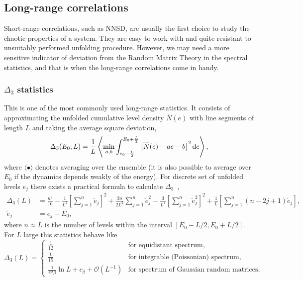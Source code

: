 \documentclass[a4paper,11pt,twoside]{article}
\begin{document}
    \subsection{Long-range correlations}
        Short-range correlations, such as NNSD, are usually the first choice to study the chaotic properties of a system.
        They are easy to work with and quite resistant to unsuitably performed unfolding procedure.
        However, we may need a more sensitive indicator of deviation from the Random Matrix Theory in the spectral statistics, and that is when the long-range correlations come in handy.

        \subsubsection{$\Delta_{3}$ statistics}
            This is one of the most commonly used long-range statistics.
            It consists of approximating the unfolded cumulative level density $\overline{N}(e)$ with line segments of length $L$ and taking the average square deviation,
            \begin{equation}
                \Delta_{3}(E_{0};L)
                =\frac{1}{L}\left\langle\min_{a,b}\int_{e_{0}-\frac{L}{2}}^{E_{0}+\frac{L}{2}}\left[\overline{N}(e)-ae-b\right]^{2}\mathrm{d} e\right\rangle,
            \end{equation}
            where $\langle\bullet\rangle$ denotes averaging over the ensemble (it is also possible to average over $E_{0}$ if the dynamics depends weakly of the energy).
            For discrete set of unfolded levels $e_{j}$ there exists a practical formula to calculate $\Delta_{3}$~\cite{Boh75},
            \begin{align}
                \Delta_{3}(L)
                    &=\frac{n^{2}}{16}-\frac{1}{L^{2}}\left[\sum_{j=1}^{n}\tilde{e}_{j}\right]^{2}+\frac{3n}{2L^{2}}\sum_{j=1}^{n}\tilde{e}_{j}^{2}-\frac{3}{L^{4}}\left[\sum_{j=1}^{n}\tilde{e}_{j}^{2}\right]^{2}+\frac{1}{L}\left[\sum_{j=1}^{n}\left(n-2j+1\right)\tilde{e}_{j}\right],\\
                \tilde{e}_{j}&=e_{j}-E_{0},\nonumber
            \end{align}
            where $n\approx L$ is the number of levels within the interval $[E_{0}-L/2,E_{0}+L/2]$.
            For $L$ large this statistics behave like
            \begin{equation}
                \Delta_{3}(L)=\left\{\begin{array}{ll}
                    \frac{1}{12} & \text{for equidistant spectrum},\\
                    \frac{L}{15} & \text{for integrable (Poissonian) spectrum},\\
                    \frac{1}{\pi^{2}\beta}\ln L+c_{\beta}+\mathcal{O}(L^{-1}) & \text{for spectrum of Gaussian random matrices},
                \end{array}\right.
                \label{eq:Delta3}
            \end{equation}
\end{document}
